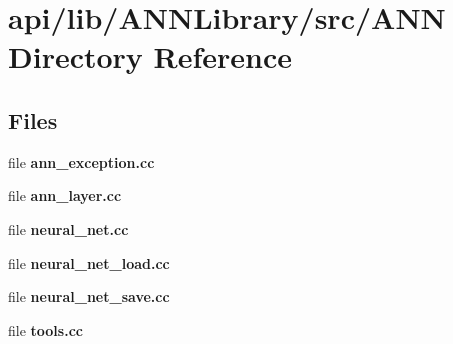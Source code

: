 \section{api/lib/\+A\+N\+N\+Library/src/\+A\+N\+N Directory Reference}
\label{dir_1147f844bd8bef128dd743a873fd2b59}
\subsection*{Files}
\begin{DoxyCompactItemize}
\item 
file {\bfseries ann\+\_\+exception.\+cc}
\item 
file {\bfseries ann\+\_\+layer.\+cc}
\item 
file {\bfseries neural\+\_\+net.\+cc}
\item 
file {\bfseries neural\+\_\+net\+\_\+load.\+cc}
\item 
file {\bfseries neural\+\_\+net\+\_\+save.\+cc}
\item 
file {\bfseries tools.\+cc}
\end{DoxyCompactItemize}
